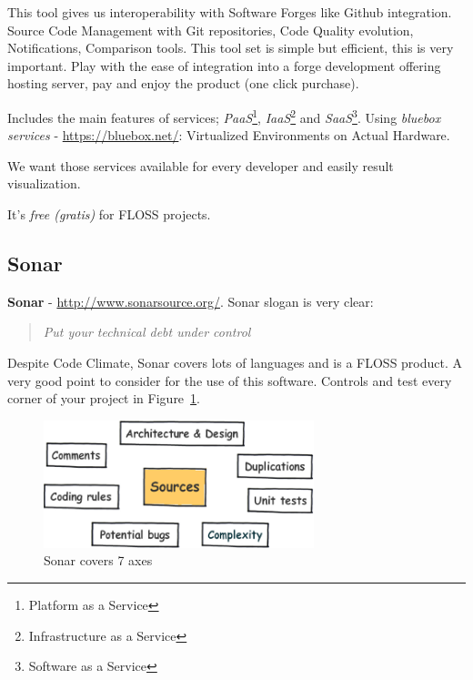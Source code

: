 \documentclass[11pt]{scrartcl}
\begin{document}
\par This tool gives us interoperability with Software Forges like Github integration. Source Code Management with Git repositories, Code Quality evolution, Notifications, Comparison tools. This tool set is simple but efficient, this is very important. Play with the ease of integration into a forge development offering hosting server, pay and enjoy the product (one click purchase).

\par Includes the main features of services; \emph{PaaS}\footnote{Platform as a Service}, \emph{IaaS}\footnote{Infrastructure as a Service} and \emph{SaaS}\footnote{Software as a Service}. Using \emph{bluebox services} - \url{https://bluebox.net/}: Virtualized Environments on Actual Hardware.

\par We want those services available for every developer and easily result visualization.

\par It's \emph{free (gratis)} for FLOSS projects.


\subsection{Sonar}
\label{sub:sonar}

\textbf{Sonar} - \url{http://www.sonarsource.org/}. Sonar slogan is very clear:

\begin{quote}
    \emph{Put your technical debt under control}
\end{quote}

\par Despite Code Climate, Sonar covers lots of languages and is a FLOSS product. A very good point to consider for the use of this software. Controls and test every corner of your project in Figure~\ref{sonar7axes}.

\begin{figure}[H]
\centering
\includegraphics[width=0.7\textwidth]{sonar7axes.png}
\caption{Sonar covers 7 axes}
\label{sonar7axes}
\end{figure}
\end{document}
